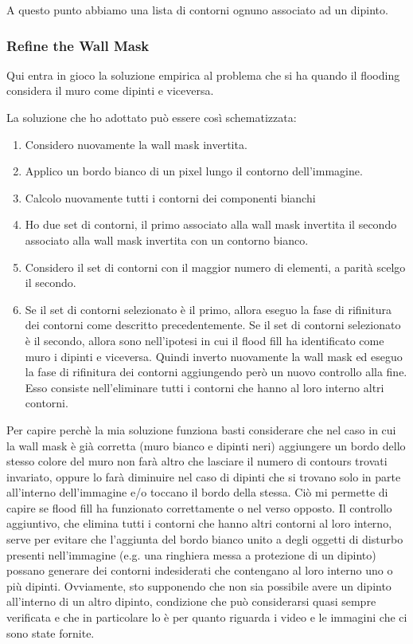 \documentclass[10pt,twocolumn,letterpaper]{article}
\begin{document}
A questo punto abbiamo una lista di contorni ognuno associato ad un dipinto.

\subsubsection{Refine the Wall Mask}

Qui entra in gioco la soluzione empirica al problema che si ha quando il flooding considera il muro come dipinti e viceversa. 

La soluzione che ho adottato può essere così schematizzata:
\begin{enumerate}
   \item Considero nuovamente la wall mask invertita.
   \item Applico un bordo bianco di un pixel lungo il contorno dell'immagine.
   \item Calcolo nuovamente tutti i contorni dei componenti bianchi
   \item Ho due set di contorni, il primo associato alla wall mask invertita il secondo associato alla wall mask invertita con un contorno bianco.
   \item Considero il set di contorni con il maggior numero di elementi, a parità scelgo il secondo.
   \item Se il set di contorni selezionato è il primo, allora eseguo la fase di rifinitura dei contorni come descritto precedentemente. Se il set di contorni selezionato è il secondo, allora sono nell'ipotesi in cui il flood fill ha identificato come muro i dipinti e viceversa. Quindi inverto nuovamente la wall mask ed eseguo la fase di rifinitura dei contorni aggiungendo però un nuovo controllo alla fine. Esso consiste nell'eliminare tutti i contorni che hanno al loro interno altri contorni.
\end{enumerate}

Per capire perchè la mia soluzione funziona basti considerare che nel caso in cui la wall mask è già corretta (muro bianco e dipinti neri) aggiungere un bordo dello stesso colore del muro non farà altro che lasciare il numero di contours trovati invariato, oppure lo farà diminuire nel caso di dipinti che si trovano solo in parte all'interno dell'immagine e/o toccano il bordo della stessa. Ciò mi permette di capire se flood fill ha funzionato correttamente o nel verso opposto. Il controllo aggiuntivo, che elimina tutti i contorni che hanno altri contorni al loro interno, serve per evitare che l'aggiunta del bordo bianco unito a degli oggetti di disturbo presenti nell'immagine (e.g. una ringhiera messa a protezione di un dipinto) possano generare dei contorni indesiderati che contengano al loro interno uno o più dipinti. Ovviamente, sto supponendo che non sia possibile avere un dipinto all'interno di un altro dipinto, condizione che può considerarsi quasi sempre verificata e che in particolare lo è per quanto riguarda i video e le immagini che ci sono state fornite.
\end{document}
